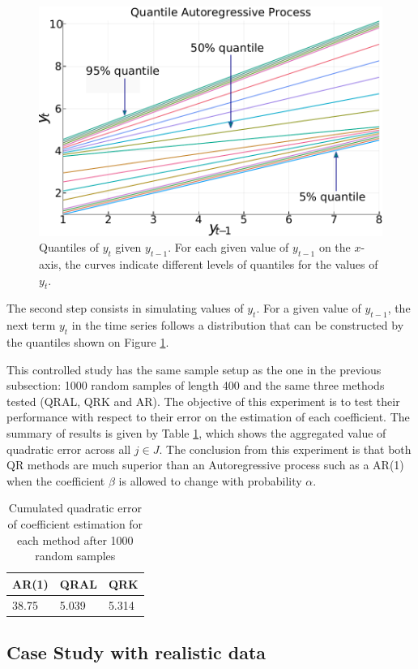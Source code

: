 \begin{figure}[h]
	\centering
	\centerline{\includegraphics[width=0.8\linewidth]{Images/Qar3.pdf}}
	\caption{Quantiles of $y_t$ given $y_{t-1}$. For each given value of $y_{t-1}$ on the $x$-axis, the curves indicate different levels of quantiles for the values of $y_t$.}
	\label{fig:qar}
\end{figure}

The second step consists in simulating values of $y_t$. For a given value of $y_{t-1}$, the next term $y_t$ in the time series follows a distribution that can be constructed by the quantiles shown on Figure \ref{fig:qar}. 

This controlled study has the same sample setup as the one in the previous subsection: 1000 random samples of length 400 and the same three methods tested (QRAL, QRK and AR). The objective of this experiment is to test their performance with respect to their error on the estimation of each coefficient. The summary of results is given by Table \ref{tab:qar-results}, which shows the aggregated value of quadratic error across all $j \in J$.
The conclusion from this experiment is that both QR methods are much superior than an Autoregressive process such as a AR(1) when the coefficient $\beta$ is allowed to change with probability $\alpha$. 
\begin{table}[h]
\centering
\caption{Cumulated quadratic error of coefficient estimation for each method after 1000 random samples}
\label{tab:qar-results}
\begin{tabular}{lll}
\hline
AR(1) & QRAL & QRK   \\ \hline
38.75 & 5.039       & 5.314
\end{tabular}
\end{table}

\subsection{Case Study with realistic data}


